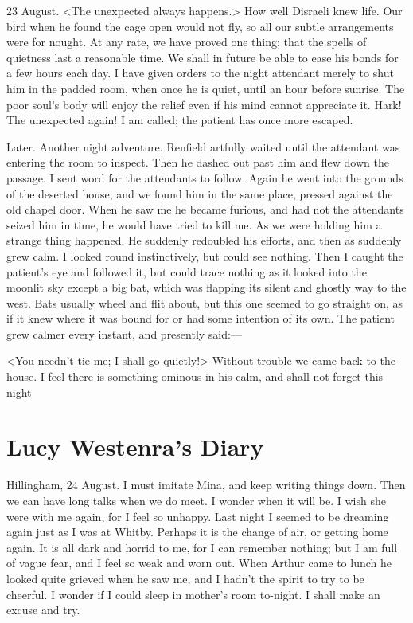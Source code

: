  
\begin{diary}{23 August.}
<The unexpected always happens.> How well Disraeli knew life. Our bird when he found the cage open would not fly, so all our subtle arrangements were for nought. At any rate, we have proved one thing; that the spells of quietness last a reasonable time. We shall in future be able to ease his bonds for a few hours each day. I have given orders to the night attendant merely to shut him in the padded room, when once he is quiet, until an hour before sunrise. The poor soul's body will enjoy the relief even if his mind cannot appreciate it. Hark! The unexpected again! I am called; the patient has once more escaped.
\end{diary}

 
\begin{diary}{Later.} 
Another night adventure. Renfield artfully waited until the attendant was entering the room to inspect. Then he dashed out past him and flew down the passage. I sent word for the attendants to follow. Again he went into the grounds of the deserted house, and we found him in the same place, pressed against the old chapel door. When he saw me he became furious, and had not the attendants seized him in time, he would have tried to kill me. As we were holding him a strange thing happened. He suddenly redoubled his efforts, and then as suddenly grew calm. I looked round instinctively, but could see nothing. Then I caught the patient's eye and followed it, but could trace nothing as it looked into the moonlit sky except a big bat, which was flapping its silent and ghostly way to the west. Bats usually wheel and flit about, but this one seemed to go straight on, as if it knew where it was bound for or had some intention of its own. The patient grew calmer every instant, and presently said:—

<You needn't tie me; I shall go quietly!> Without trouble we came back to the house. I feel there is something ominous in his calm, and shall not forget this night
\end{diary}


\section{Lucy Westenra's Diary}

\begin{diary}{Hillingham, 24 August.}
I must imitate Mina, and keep writing things down. Then we can have long talks when we do meet. I wonder when it will be. I wish she were with me again, for I feel so unhappy. Last night I seemed to be dreaming again just as I was at Whitby. Perhaps it is the change of air, or getting home again. It is all dark and horrid to me, for I can remember nothing; but I am full of vague fear, and I feel so weak and worn out. When Arthur came to lunch he looked quite grieved when he saw me, and I hadn't the spirit to try to be cheerful. I wonder if I could sleep in mother's room to-night. I shall make an excuse and try.
\end{diary}

